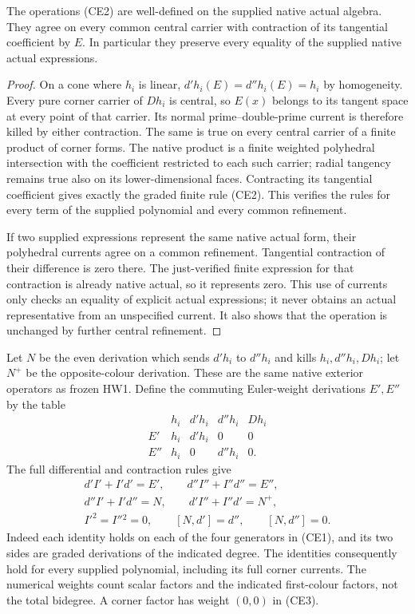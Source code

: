 \begin{lemma}
The operations (CE2) are well-defined on the supplied native actual
algebra.  They agree on every common central carrier with contraction
of its tangential coefficient by $E$.  In particular they preserve
every equality of the supplied native actual expressions.
\end{lemma}

\begin{proof}
On a cone where $h_i$ is linear, $d'h_i(E)=d''h_i(E)=h_i$ by
homogeneity.  Every pure corner carrier of $Dh_i$ is central, so
$E(x)$ belongs to its tangent space at every point of that carrier.
Its normal prime--double-prime current is therefore killed by either
contraction.  The same is true on every central carrier of a finite
product of corner forms.  The native product is a finite weighted
polyhedral intersection with the coefficient restricted to each such
carrier; radial tangency remains true also on its lower-dimensional
faces.  Contracting its tangential coefficient gives exactly the
graded finite rule (CE2).  This verifies the rules for every term of
the supplied polynomial and every common refinement.

If two supplied expressions represent the same native actual form,
their polyhedral currents agree on a common refinement.  Tangential
contraction of their difference is zero there.  The just-verified
finite expression for that contraction is already native actual, so
it represents zero.  This use of currents only checks an equality of
explicit actual expressions; it never obtains an actual representative
from an unspecified current.  It also shows that the operation is
unchanged by further central refinement.
\end{proof}

Let $N$ be the even derivation which sends $d'h_i$ to $d''h_i$ and
kills $h_i,d''h_i,Dh_i$; let $N^+$ be the opposite-colour derivation.
These are the same native exterior operators as frozen HW1.
Define the commuting Euler-weight derivations $E',E''$ by the table
\[
\begin{array}{c|cccc}
 &h_i&d'h_i&d''h_i&Dh_i\\\hline
 E'&h_i&d'h_i&0&0\\
 E''&h_i&0&d''h_i&0.
\end{array}
\tag{CE3}
\]
The full differential and contraction rules give
\[
\begin{gathered}
 d'I'+I'd'=E',\qquad d''I''+I''d''=E'',\\
 d''I'+I'd''=N,\qquad d'I''+I''d'=N^+,\\
 I'^2=I''{}^2=0,\qquad [N,d']=d'',\qquad[N,d'']=0.
\end{gathered}
\tag{CE4}
\]
Indeed each identity holds on each of the four generators in (CE1),
and its two sides are graded derivations of the indicated degree.
The identities consequently hold for every supplied polynomial,
including its full corner currents.  The numerical weights count
scalar factors and the indicated first-colour factors, not the total
bidegree.  A corner factor has weight $(0,0)$ in (CE3).

